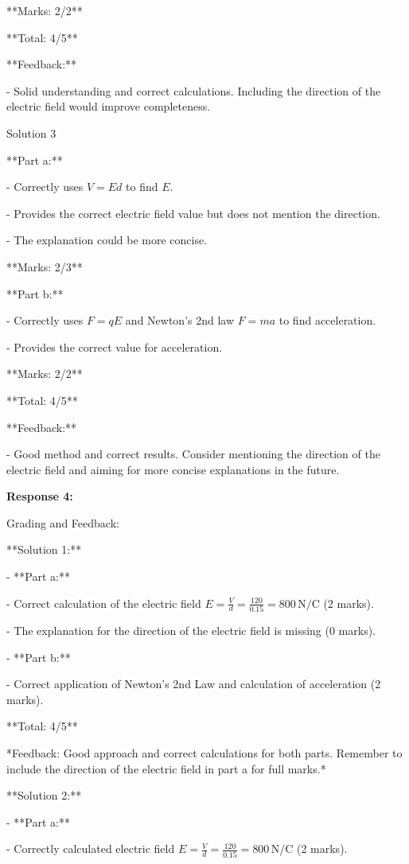 \documentclass[a4paper,11pt]{article}
\begin{document}
**Marks: 2/2**

**Total: 4/5**

**Feedback:**

- Solid understanding and correct calculations. Including the direction of the electric field would improve completeness.

Solution 3

**Part a:**

- Correctly uses \( V = Ed \) to find \( E \).

- Provides the correct electric field value but does not mention the direction.

- The explanation could be more concise.

**Marks: 2/3**

**Part b:**

- Correctly uses \( F = qE \) and Newton’s 2nd law \( F = ma \) to find acceleration.

- Provides the correct value for acceleration.

**Marks: 2/2**

**Total: 4/5**

**Feedback:**

- Good method and correct results. Consider mentioning the direction of the electric field and aiming for more concise explanations in the future.

\bigskip
\textbf{Response 4:}

Grading and Feedback:

**Solution 1:**

- **Part a:**

  - Correct calculation of the electric field \(E = \frac{V}{d} = \frac{120}{0.15} = 800 \, \text{N/C}\) (2 marks).
  
  - The explanation for the direction of the electric field is missing (0 marks).

- **Part b:**

  - Correct application of Newton’s 2nd Law and calculation of acceleration (2 marks).

**Total: 4/5**

*Feedback: Good approach and correct calculations for both parts. Remember to include the direction of the electric field in part a for full marks.*

**Solution 2:**

- **Part a:**

  - Correctly calculated electric field \(E = \frac{V}{d} = \frac{120}{0.15} = 800 \, \text{N/C}\) (2 marks).
  
\end{document}
